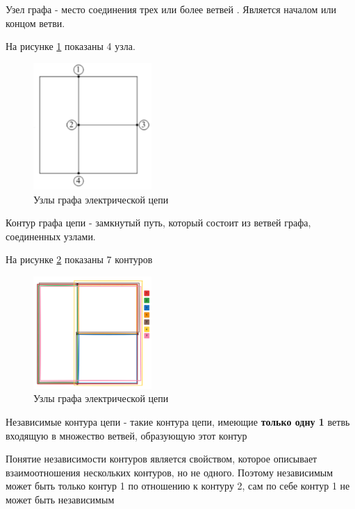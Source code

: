 Узел графа - место соединения трех или более ветвей . Является началом или концом ветви. 

На рисунке \ref{fig:graph3} показаны 4 узла.

\begin{figure}[H]
    \centering
    \includegraphics[width=0.4\textwidth]{images/image_3_contures_nodes_branches.png}
    \caption{Узлы графа электрической цепи}
    \label{fig:graph3}
\end{figure}

Контур графа цепи - замкнутый путь, который состоит из ветвей графа, соединенных узлами.

На рисунке \ref{fig:graph4} показаны 7 контуров

\begin{figure}[H]
    \centering
    \includegraphics[width=0.4\textwidth]{images/image_4_contures_nodes_branches.png}
    \caption{Узлы графа электрической цепи}
    \label{fig:graph4}
\end{figure}

Независимые контура цепи - такие контура цепи, имеющие \textbf{только одну 1} ветвь входящую в множество ветвей, образующую этот контур 

Понятие независимости контуров является свойством, которое описывает взаимоотношения нескольких контуров, но не одного. Поэтому независимым может быть только контур 1 по отношению к контуру 2, сам по себе контур 1 не может быть независимым

